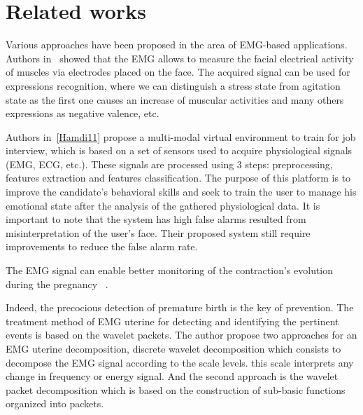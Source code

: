 \documentclass[conference]{IEEEtran}
\begin{document}
\section{Related works} \label{sec:related}
Various approaches have been proposed in the area of EMG-based applications. Authors in~\cite{Hamdi12} showed that the EMG allows to measure the facial electrical activity of muscles via electrodes placed on the face. The acquired signal can be used for expressions recognition, where we can distinguish a stress state from agitation state as the first one causes an increase of muscular activities and many others expressions as negative valence, etc. \par
Authors in~\ref{Hamdi11} propose a multi-modal virtual environment to train for job interview, which is based on a set of sensors used to acquire physiological signals (EMG, ECG, etc.). These signals are processed using 3 steps: preprocessing, features extraction and features classification. The purpose of this platform is to improve the candidate's behavioral skills and seek to train the user to manage his emotional state after the analysis of the gathered physiological data. It is important to note that the system has high false alarms resulted from misinterpretation of the user's face. Their proposed system still require improvements to reduce the false alarm rate.\par
The EMG signal can enable better monitoring of the contraction's evolution during the pregnancy~\cite{Chendab} .\par Indeed, the precocious detection of premature birth is the key of prevention. The treatment method of EMG uterine for detecting and identifying the pertinent events is based on the wavelet packets.
The author propose two approaches for an EMG uterine decomposition, discrete wavelet decomposition which consists to decompose the EMG signal according to the scale levels. this scale interprets any change in frequency or energy signal. And the second approach is the wavelet packet decomposition which is based on the construction of sub-basic functions organized into packets.
\end{document}

